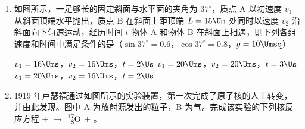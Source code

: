 \documentclass[\gkver]{gaokaozhenti}
\begin{document}
\begin{enumerate}
\onepicture[w=4.37cm]{}

{电阻 $R_{2}$ 消耗的热功率为 $\frac{Fv}{6}$}
{整个装置因摩擦而消耗的热功率为 $\mu mgv\cos\theta$}
{整个装置消耗的机械功率为 $(F+\mu mg\cos\theta)v$}


\item
如图所示，一足够长的固定斜面与水平面的夹角为 $37^{\circ}$，质点 A 以初速度 $v_{1}$ 从斜面顶端水平抛出，质点 B 在斜面上距顶端 $L=15\Um$ 处同时以速度 $v_{2}$ 沿斜面向下匀速运动，经历时间 $t$ 物体 A 和物体 B 在斜面上相遇，则下列各组速度和时间中满足条件的是（$\sin37^{\circ}=0.6$，$\cos37^{\circ}=0.8$，$g=10\Umsq$）

\onepicture[w=3.78cm]{}

{$v_{1}=16\Ums$，$v_{2}=16\Ums$，$t=2\Us$}
{$v_{1}=20\Ums$，$v_{2}=20\Ums$，$t=3\Us$}
{$v_{1}=20\Ums$，$v_{2}=16\Ums$，$t=2\Us$}


\item
1919 年卢瑟福通过如图所示的实验装置，第一次完成了原子核的人工转变，并由此发现。图中 A 为放射源发出的\tkanswer[1.0cm]{$\alpha$}粒子，B 为气。完成该实验的下列核反应方程 $+$  $\to$ $\ce{^{17}_{8}O}$ $+$ 。

\onepicture[align=right, w=5.47cm]{}



\end{enumerate}
\end{document}
